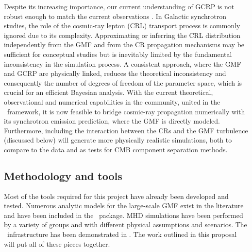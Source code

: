 Despite its increasing importance, our current understanding of GCRP is not robust enough to match the current observations \citep{Cui2017}.
In Galactic synchrotron studies, the role of the cosmic-ray lepton (CRL) transport process is commonly ignored due to its complexity.
Approximating or inferring the CRL distribution independently from the GMF and from the CR propagation mechanisms may be sufficient for conceptual studies but is inevitably limited by the fundamental inconsistency in the simulation process.  
A consistent approach, where the GMF and GCRP are physically linked, reduces the  theoretical inconsistency and consequently the number of degrees of freedom of the parameter space, which is crucial for an efficient Bayesian analysis.
With the current theoretical, observational and numerical capabilities in the community, united in the \imagine\ framework, it is now feasible to bridge cosmic-ray propagation numerically with its synchrotron emission prediction, where the GMF is directly modeled.  Furthermore, including the interaction between the CRs and the GMF turbulence (discussed below) will generate more physically realistic simulations, both to compare to the data and as tests for CMB component separation methods. 




\subsection*{Methodology and tools}

Most of the tools required for this project have already been developed and tested. Numerous analytic models for the large-scale GMF exist in the literature and have been included in the \hammurabi\ package. MHD simulations have been performed by a variety of groups and with different physical assumptions and scenarios.  The \imagineSW\ infrastructure has been demonstrated in \cite{steininger:2018}.  The work outlined in this proposal will put all of these pieces together.  

